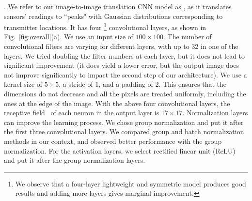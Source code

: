 
. 
We refer to our image-to-image translation CNN model as \imgimg, as it translates sensors' 
readings to ``peaks" with Gaussian distributions corresponding to transmitter locations.  
It has four \footnote{We observe that a four-layer lightweight and symmetric \imgimg  model produces good results and adding more layers gives marginal improvement.}
convolutional layers, as shown in Fig.~\ref{fig:overall}(a). 
We use an input size of $100\times100$. The number of convolutional filters are varying for
different layers, with up to 32 in one of the layers. 
We tried doubling the filter numbers at each layer, but it does not lead to significant 
improvement (it does yield a lower error, but the output image does not improve significantly
to impact the second step of our architecture). We use a kernel size of $5\times5$, a stride of 1, and a padding of 2.
This ensures that the dimensions do not decrease and all the pixels are treated 
uniformly, including the ones at the edge of the image.
With the above four convolutional layers, the receptive field~\cite{receptive-field} of each neuron in the output layer is $17\times17$.
Normalization layers can improve the learning process. We chose group normalization \cite{groupnorm} and put it after the first three convolutional layers. 
We compared group and batch normalization~\cite{batchnorm} methods in our context, and observed
better performance with the group normalization. 
For the activation layers, we select rectified linear unit (ReLU) and put it after the group normalization layers.

